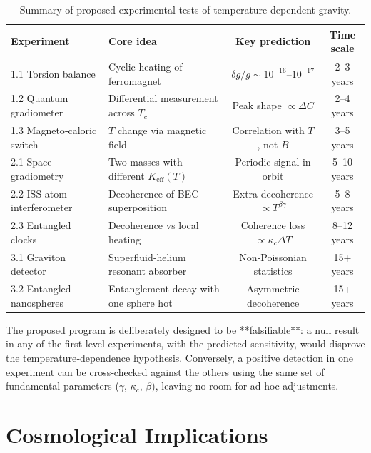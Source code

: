 \documentclass[12pt]{article}
\theoremstyle{remark}
\newcommand{\Keff}{K_{\mathrm{eff}}}
\begin{document}
	\begin{table}[htbp]
		\centering
		\caption{Summary of proposed experimental tests of temperature‑dependent gravity.}
		\label{tab:experiment-summary}
		\small
		\begin{tabularx}{\textwidth}{l X c c}
			\toprule
			\textbf{Experiment} & \textbf{Core idea} & \textbf{Key prediction} & \textbf{Time scale} \\
			\midrule
			1.1 Torsion balance & Cyclic heating of ferromagnet & \(\delta g/g \sim 10^{-16}\)–\(10^{-17}\) & 2–3 years \\
			1.2 Quantum gradiometer & Differential measurement across \(T_c\) & Peak shape \(\propto \Delta C\) & 2–4 years \\
			1.3 Magneto‑caloric switch & \(T\) change via magnetic field & Correlation with \(T\), not \(B\) & 3–5 years \\
			2.1 Space gradiometry & Two masses with different \(\Keff(T)\) & Periodic signal in orbit & 5–10 years \\
			2.2 ISS atom interferometer & Decoherence of BEC superposition & Extra decoherence \(\propto T^{\beta\gamma}\) & 5–8 years \\
			2.3 Entangled clocks & Decoherence vs local heating & Coherence loss \(\propto \kappa_c \Delta T\) & 8–12 years \\
			3.1 Graviton detector & Superfluid‑helium resonant absorber & Non‑Poissonian statistics & 15+ years \\
			3.2 Entangled nanospheres & Entanglement decay with one sphere hot & Asymmetric decoherence & 15+ years \\
			\bottomrule
		\end{tabularx}
	\end{table}
	
	The proposed program is deliberately designed to be **falsifiable**: a null result in any of the first‑level
	experiments, with the predicted sensitivity, would disprove the temperature‑dependence hypothesis.
	Conversely, a positive detection in one experiment can be cross‑checked against the others using the same set
	of fundamental parameters (\(\gamma\), \(\kappa_c\), \(\beta\)), leaving no room for ad‑hoc adjustments.
	
	
	\section{Cosmological Implications}
	\label{sec:cosmo}
	
\end{document}
